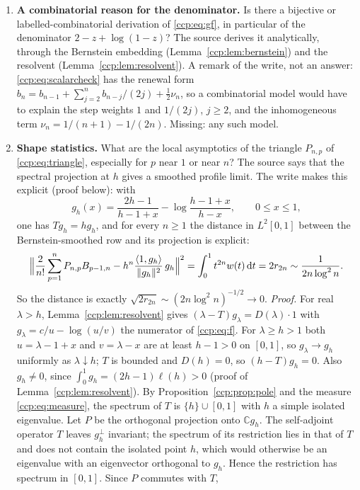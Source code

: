 \documentclass[11pt,letterpaper]{article}
\theoremstyle{remark}\newtheorem{remark}[theorem]{Remark}
\newcommand{\dd}{\,\mathrm d}
\newcommand{\C}{\mathbb C}
\newcommand{\norm}[1]{\lVert #1\rVert}
\begin{document}
\begin{enumerate}
\item\label{ccp:q:combinatorial} \textbf{A combinatorial reason for the
denominator.} Is there a bijective or labelled-combinatorial derivation of
\eqref{ccp:eq:gf}, in particular of the denominator $2-z+\log(1-z)$? The
source derives it analytically, through the Bernstein embedding
(Lemma~\ref{ccp:lem:bernstein}) and the resolvent
(Lemma~\ref{ccp:lem:resolvent}). A remark of the write, not an answer:
\eqref{ccp:eq:scalarcheck} has the renewal form
$b_n=b_{n-1}+\sum_{j=2}^nb_{n-j}/(2j)+\frac12\nu_n$, so a combinatorial
model would have to explain the step weights $1$ and $1/(2j)$, $j\ge2$, and
the inhomogeneous term $\nu_n=1/(n+1)-1/(2n)$. Missing: any such model.

\item\label{ccp:q:profile} \textbf{Shape statistics.} What are the local
asymptotics of the triangle $P_{n,p}$ of \eqref{ccp:eq:triangle},
especially for $p$ near $1$ or near $n$? The source says that the spectral
projection at $h$ gives a smoothed profile limit. The write makes this
explicit (proof below): with
\[
g_h(x)=\frac{2h-1}{h-1+x}-\log\frac{h-1+x}{h-x},\qquad 0\le x\le1,
\]
one has $Tg_h=hg_h$, and for every $n\ge1$ the distance in $L^2[0,1]$
between the Bernstein-smoothed row and its projection is explicit:
\[
\Bigl\|\frac2{n!}\sum_{p=1}^nP_{n,p}B_{p-1,n}
-h^n\frac{\langle1,g_h\rangle}{\norm{g_h}^2}\,g_h\Bigr\|^2
=\int_0^1t^{2n}w(t)\dd t=2r_{2n}\sim\frac1{2n\log^2n}.
\]
So the distance is exactly $\sqrt{2r_{2n}}\sim(2n\log^2n)^{-1/2}\to0$.
\emph{Proof.} For real $\lambda>h$, Lemma~\ref{ccp:lem:resolvent} gives
$(\lambda-T)g_\lambda=D(\lambda)\cdot1$ with $g_\lambda=c/u-\log(u/v)$ the
numerator of \eqref{ccp:eq:f}. For $\lambda\ge h>1$ both $u=\lambda-1+x$ and
$v=\lambda-x$ are at least $h-1>0$ on $[0,1]$, so $g_\lambda\to g_h$
uniformly as $\lambda\downarrow h$; $T$ is bounded and $D(h)=0$, so
$(h-T)g_h=0$. Also $g_h\ne0$, since $\int_0^1g_h=(2h-1)\ell(h)>0$ (proof of
Lemma~\ref{ccp:lem:resolvent}). By Proposition~\ref{ccp:prop:pole} and the
measure \eqref{ccp:eq:measure}, the spectrum of $T$ is $\{h\}\cup[0,1]$
with $h$ a simple isolated eigenvalue. Let $P$ be the orthogonal projection
onto $\C g_h$. The self-adjoint operator $T$ leaves $g_h^\perp$ invariant;
the spectrum of its restriction lies in that of $T$ and does not contain
the isolated point $h$, which would otherwise be an eigenvalue with an
eigenvector orthogonal to $g_h$. Hence the restriction has spectrum in
$[0,1]$. Since $P$ commutes with $T$,

\end{enumerate}
\end{document}
